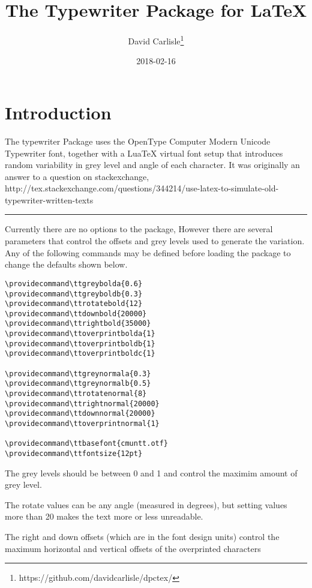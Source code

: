 \documentclass{article}
\begin{document}
\title{The Typewriter Package for LaTeX}
\author{David Carlisle\thanks{https://github.com/davidcarlisle/dpctex/}}
\date{2018-02-16}

\maketitle

\section{Introduction}
The typewriter Package uses the OpenType Computer Modern Unicode
Typewriter font, together with a LuaTeX virtual font setup that
introduces random variability in grey level and angle of each
character. It was originally an answer to a question on stackexchange,
http://tex.stackexchange.com/questions/344214/use-latex-to-simulate-old-typewriter-written-texts


\hrule

Currently there are no options to the package, However there are several parameters that control the offsets
and grey levels used to generate the variation. Any of the following
commands may be defined before loading the package to change the defaults shown below.

\begin{verbatim}
\providecommand\ttgreybolda{0.6}
\providecommand\ttgreyboldb{0.3}
\providecommand\ttrotatebold{12}
\providecommand\ttdownbold{20000}
\providecommand\ttrightbold{35000}
\providecommand\ttoverprintbolda{1}
\providecommand\ttoverprintboldb{1}
\providecommand\ttoverprintboldc{1}

\providecommand\ttgreynormala{0.3}
\providecommand\ttgreynormalb{0.5}
\providecommand\ttrotatenormal{8}
\providecommand\ttrightnormal{20000}
\providecommand\ttdownnormal{20000}
\providecommand\ttoverprintnormal{1}

\providecommand\ttbasefont{cmuntt.otf}
\providecommand\ttfontsize{12pt}
\end{verbatim}

The grey levels should be between 0 and 1 and control the maximim
amount of grey level.

The rotate values can be any angle (measured in degrees), but setting
values more than 20 makes the text more or less unreadable.

The right and down offsets (which are in the font design units) control the
maximum horizontal and vertical offsets of the overprinted characters
\end{document}
